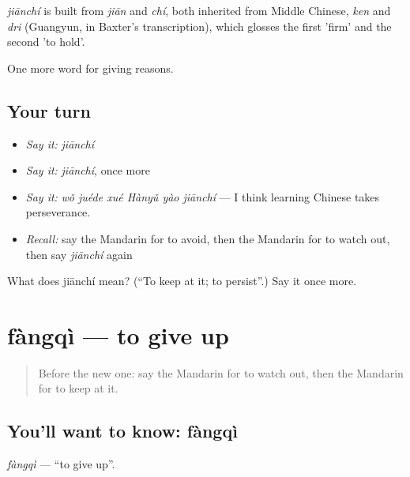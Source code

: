 \begin{cousinweb}
\emph{jiānchí} is built from \emph{jiān} and \emph{chí}, both inherited from Middle Chinese, \emph{ken} and \emph{dri} (Guangyun, in Baxter's transcription), which glosses the first 'firm' and the second 'to hold'.
\end{cousinweb}

\begin{grammarlens}[title={What you've built}]
One more word for giving reasons.
\end{grammarlens}

\subsection*{Your turn}
\begin{itemize}
\raggedright
  \item \emph{Say it:} \emph{jiānchí}
  \item \emph{Say it:} \emph{jiānchí}, once more
  \item \emph{Say it:} \emph{wǒ juéde xué Hànyǔ yào jiānchí} — I think learning Chinese takes perseverance.
  \item \emph{Recall:} say the Mandarin for to avoid, then the Mandarin for to watch out, then say \emph{jiānchí} again
\end{itemize}

\begin{tcolorbox}[breakable,colback=teal!4,colframe=teal!35!black,title={Before you move on}]
What does jiānchí mean? (\textquotedblleft{}To keep at it; to persist\textquotedblright{}.) Say it once more.
\end{tcolorbox}
\section[fàngqì]{fàngqì — to give up}

\label{lesson:ZH-C366-fangqi}



\begin{quote}
Before the new one: say the Mandarin for to watch out, then the Mandarin for to keep at it.
\end{quote}

\subsection*{You'll want to know: fàngqì}
\emph{fàngqì} — \textquotedblleft{}to give up\textquotedblright{}.


